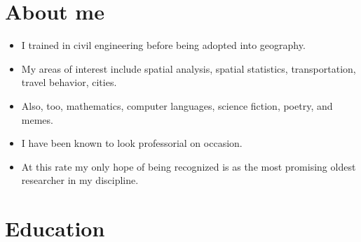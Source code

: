 \documentclass[10pt,a4paper,]{twentysecondcv}
\providecommand{\tightlist}{%
  \setlength{\itemsep}{0pt}\setlength{\parskip}{0pt}}
\begin{document}



\makeprofile %




\hypertarget{about-me}{%
\section{About me}\label{about-me}}

\begin{itemize}
\tightlist
\item
  I trained in civil engineering before being adopted into geography.
\item
  My areas of interest include spatial analysis, spatial statistics,
  transportation, travel behavior, cities.
\item
  Also, too, mathematics, computer languages, science fiction, poetry,
  and memes.
\item
  I have been known to look professorial on occasion.
\item
  At this rate my only hope of being recognized is as the most promising
  oldest researcher in my discipline.
\end{itemize}

\hypertarget{education}{%
\section{Education}\label{education}}

\nopagebreak

\begin{twenty}
\end{twenty}
\end{document}
